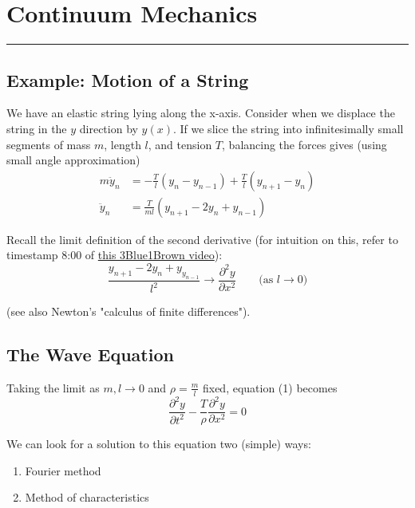 \documentclass[12pt]{article}
\newcommand{\partials}[3][]{\ensuremath{\frac{\partial^{#1} {#2}}{\partial {#3}^{#1}}}}
\begin{document}
\setcounter{section}{7}
\section{Continuum Mechanics}
\par\noindent\rule{\textwidth}{1pt}
\subsection{Example: Motion of a String} \label{system1}
We have an elastic string lying along the x-axis. Consider when we displace the string in the $y$ direction by $y(x)$. If we slice the string into infinitesimally small segments of mass $m$, length $l$, and tension $T$, balancing the forces gives (using small angle approximation)
\begin{equation}
	\begin{aligned}
		m\ddot{y}_n &= -\frac{T}{l}(y_n - y_{n-1}) + \frac{T}{l}(y_{n+1} - y_n)\\
		\ddot{y}_n &= \frac{T}{ml}(y_{n+1} - 2y_n + y_{n-1})
	\end{aligned}
\end{equation}

Recall the limit definition of the second derivative (for intuition on this, refer to timestamp 8:00 of \href{https://www.youtube.com/watch?v=ly4S0oi3Yz8&t=480s}{this 3Blue1Brown video}):
\begin{equation}
	\frac{y_{n+1} - 2y_n + y_{y_{n-1}}}{l^2} \to \partials[2]{y}{x} \quad\quad \text{(as $l \to 0$)}
\end{equation}

(see also Newton's "calculus of finite differences").

\subsection{The Wave Equation}
Taking the limit as $m, l \to 0$ and $\rho = \frac{m}{l}$ fixed, equation (1) becomes
\begin{equation}
	\tag{Wave Equation}
	\partials[2]{y}{t} - \frac{T}{\rho}\partials[2]{y}{x} = 0
\end{equation}

We can look for a solution to this equation two (simple) ways:
\begin{enumerate}
	\item Fourier method
	\item Method of characteristics
\end{enumerate}
\end{document}

